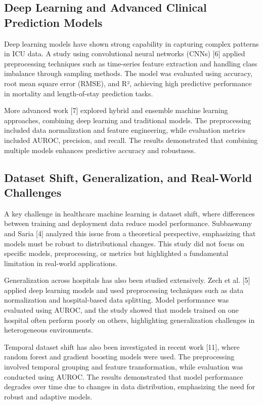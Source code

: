 \documentclass[11pt]{article}
\begin{document}
\subsection{Deep Learning and Advanced Clinical Prediction Models
}
Deep learning models have shown strong capability in capturing complex patterns in ICU data. A study using convolutional neural networks (CNNs) [6] applied preprocessing techniques such as time-series feature extraction and handling class imbalance through sampling methods. The model was evaluated using accuracy, root mean square error (RMSE), and R², achieving high predictive performance in mortality and length-of-stay prediction tasks.

More advanced work [7] explored hybrid and ensemble machine learning approaches, combining deep learning and traditional models. The preprocessing included data normalization and feature engineering, while evaluation metrics included AUROC, precision, and recall. The results demonstrated that combining multiple models enhances predictive accuracy and robustness.


 

\subsection{Dataset Shift, Generalization, and Real-World Challenges
}

A key challenge in healthcare machine learning is dataset shift, where differences between training and deployment data reduce model performance. Subbaswamy and Saria [4] analyzed this issue from a theoretical perspective, emphasizing that models must be robust to distributional changes. This study did not focus on specific models, preprocessing, or metrics but highlighted a fundamental limitation in real-world applications.

Generalization across hospitals has also been studied extensively. Zech et al. [5] applied deep learning models and used preprocessing techniques such as data normalization and hospital-based data splitting. Model performance was evaluated using AUROC, and the study showed that models trained on one hospital often perform poorly on others, highlighting generalization challenges in heterogeneous environments.

Temporal dataset shift has also been investigated in recent work [11], where random forest and gradient boosting models were used. The preprocessing involved temporal grouping and feature transformation, while evaluation was conducted using AUROC. The results demonstrated that model performance degrades over time due to changes in data distribution, emphasizing the need for robust and adaptive models.
\end{document}
